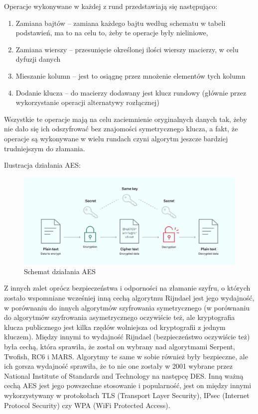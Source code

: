 Operacje wykonywane w każdej z rund przedstawiają się następująco:
\begin{enumerate}
    \item Zamiana bajtów – zamiana każdego bajtu według schematu w tabeli podstawień, ma to na celu to, żeby te operacje były nieliniowe,
    \item Zamiana wierszy – przesunięcie określonej ilości wierszy macierzy, w celu dyfuzji danych
    \item Mieszanie kolumn – jest to osiągnę przez mnożenie elementów tych kolumn
    \item Dodanie klucza – do macierzy dodawany jest klucz rundowy (głównie przez wykorzystanie operacji alternatywy rozłącznej)
\end{enumerate}
Wszystkie te operacje mają na celu zaciemnienie oryginalnych danych tak, żeby nie dało się ich odszyfrować bez znajomości symetrycznego klucza, a fakt, że operacje są wykonywane w wielu rundach czyni algorytm jeszcze bardziej trudniejszym do złamania.

\vspace{1em}

Ilustracja działania AES:
\begin{figure}[H]
    \centering
    \includegraphics[width=\textwidth]{Images/AES1.png}
    \caption{Schemat działania AES}
    \label{fig:AES1}
\end{figure}
Z innych zalet oprócz bezpieczeństwa i odporności na złamanie szyfru, o których zostało wspomniane wcześniej inną cechą algorytmu Rijndael jest jego wydajność, w porównaniu do innych algorytmów szyfrowania symetrycznego (w porównaniu do algorytmów szyfrowania asymetrycznego oczywiście też, ale kryptografia klucza publicznego jest kilka rzędów wolniejsza od kryptografii z jednym kluczem). Między innymi to wydajność Rijndael (bezpieczeństwo oczywiście też) była cechą, która sprawiła, że został on wybrany nad algorytmami Serpent, Twofish, RC6 i MARS. Algorytmy te same w sobie również były bezpieczne, ale ich gorsza wydajność sprawiła, że to nie one zostały w 2001 wybrane przez National Institute of Standards and Technology na następcę DES. Inną ważną cechą AES jest jego powszechne stosowanie i popularność, jest on między innymi wykorzystywany w protokołach TLS (Transport Layer Security), IPsec (Internet Protocol Security) czy WPA (WiFi Protected Access).
